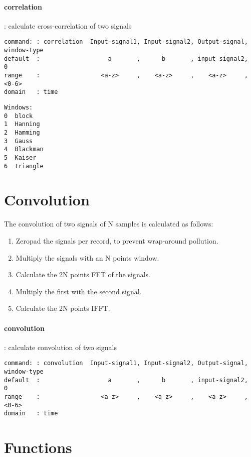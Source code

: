 \documentclass{report}
\newcommand{\bc}{\scriptsize}
\newcommand{\ec}{\normalsize}
\begin{document}
\paragraph{correlation}: calculate cross-correlation of two signals

\bc
\begin{verbatim}
command: : correlation  Input-signal1, Input-signal2, Output-signal, window-type
default  :                   a       ,      b       , input-signal2,      0
range    :                 <a-z>     ,    <a-z>     ,    <a-z>     ,    <0-6>
domain   : time
\end{verbatim}
\ec

\begin{verbatim}
Windows:
0  block
1  Hanning
2  Hamming
3  Gauss
4  Blackman
5  Kaiser
6  triangle
\end{verbatim}

\section{Convolution}

The convolution of two signals of N samples is calculated as follows:

\begin{enumerate}
  \item Zeropad the signals per record, to prevent wrap-around pollution.
  \item Multiply the signals with an N points window.
  \item Calculate the 2N points FFT of the signals.
  \item Multiply the first with the second signal.
  \item Calculate the 2N points IFFT.
\end{enumerate}


\paragraph{convolution}: calculate convolution of two signals

\bc
\begin{verbatim}
command: : convolution  Input-signal1, Input-signal2, Output-signal, window-type
default  :                   a       ,      b       , input-signal2,      0
range    :                 <a-z>     ,    <a-z>     ,    <a-z>     ,    <0-6>
domain   : time
\end{verbatim}
\ec

\section{Functions}
\end{document}
